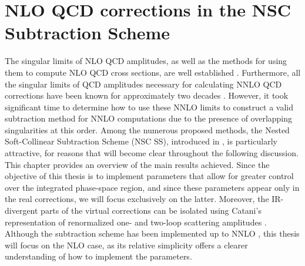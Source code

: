 \documentclass[a4paper, 12pt]{book}
\begin{document}
\chapter{NLO QCD corrections in the NSC Subtraction Scheme}
\label{NSC-SS}
The singular limits of NLO QCD amplitudes, as well as the methods for using them to compute NLO QCD cross sections, are well established \cite{Frixione:1995ms,Catani:1996vz}. Furthermore, all the singular limits of QCD amplitudes necessary for calculating NNLO QCD corrections have been known for approximately two decades \cite{Catani:1996vz}. However, it took significant time to determine how to use these NNLO limits to construct a valid subtraction method for NNLO computations due to the presence of overlapping singularities at this order. Among the numerous proposed methods, the Nested Soft-Collinear Subtraction Scheme (NSC SS), introduced in \cite{Caola:2017dug}, is particularly attractive, for reasons that will become clear throughout the following discussion. \\
This chapter provides an overview of the main results achieved. Since the objective of this thesis is to implement parameters that allow for greater control over the integrated phase-space region, and since these parameters appear only in the real corrections, we will focus exclusively on the latter. Moreover, the IR-divergent parts of the virtual corrections can be isolated using Catani's representation of renormalized one- and two-loop scattering amplitudes \cite{Catani:1998bh}. Although the subtraction scheme has been implemented up to NNLO \cite{Caola:1902, Caola:1907, Asteriadis:1910, Devoto:2023rpv, Devoto:2025kin}, this thesis will focus on the NLO case, as its relative simplicity offers a clearer understanding of how to implement the parameters.
\end{document}
